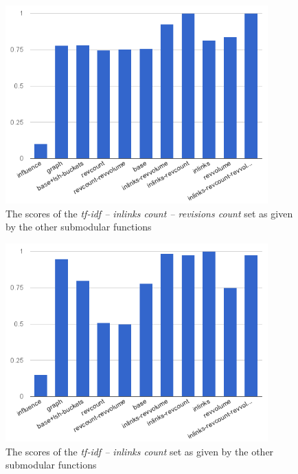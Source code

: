 \begin{figure}
  \centering
  \includegraphics[width=0.9\textwidth,natwidth=555,natheight=419]{images/inl-rc.png}
  \caption{The scores of the \emph{tf-idf -- inlinks count -- revisions count}
  set as given by the other submodular functions}
  \label{img:inl-rc}
\end{figure}

\begin{figure}
  \centering
  \includegraphics[width=0.9\textwidth,natwidth=555,natheight=419]{images/inl.png}
  \caption{The scores of the \emph{tf-idf -- inlinks count} set as given by the
  other submodular functions}
  \label{img:inl}
\end{figure}

